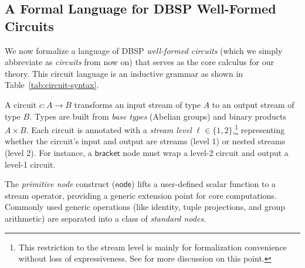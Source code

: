 \subsection{A Formal Language for DBSP Well-Formed Circuits}\label{sec:pre-language}

We now formalize a language of DBSP \emph{well-formed circuits} (which we simply abbreviate as \emph{circuits} from now on) that serves as the core calculus for our theory.
This circuit language is an inductive grammar as shown in Table~\ref{tab:circuit-syntax}.

A circuit $c : A \to B$ transforms an input stream of type $A$ to an output stream of type $B$. Types are built from \emph{base types} (Abelian groups) and binary products $A \times B$.
Each circuit is annotated with a \emph{stream level} $\ell \in \{1, 2\}$,\footnote{\label{fn:stream-level}
  This restriction to the stream level is mainly for formalization convenience without loss of expressiveness. See  for more discussion on this point.
} representing whether the circuit's input and output are streams (level 1) or nested streams (level 2). For instance, a $\mathsf{bracket}$ node must wrap a level-2 circuit and output a level-1 circuit.

The \emph{primitive node} construct ($\mathsf{node}$) lifts a user-defined scalar function to a stream operator, providing a generic extension point for core computations. Commonly used generic operations (like identity, tuple projections, and group arithmetic) are separated into a class of \emph{standard nodes}.

